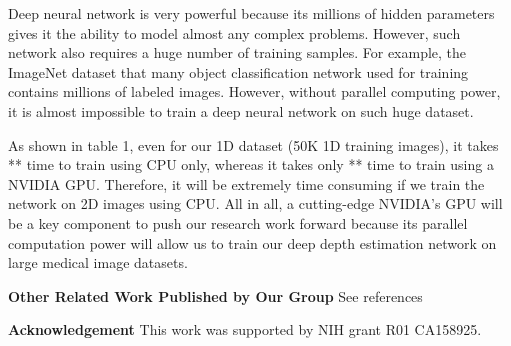 \documentclass{llncs}
\begin{document}
Deep neural network is very powerful because its millions of hidden parameters gives it the ability to model almost any complex problems. However, such network also requires a huge number of training samples. For example, the ImageNet dataset that many object classification network used for training contains millions of labeled images. However, without parallel computing power, it is almost impossible to train a deep neural network on such huge dataset. 

As shown in table 1, even for our 1D dataset (50K 1D training images), it takes ** time to train using CPU only, whereas it takes only ** time to train using a NVIDIA GPU.  Therefore, it will be extremely time consuming if we train the network on 2D images using CPU. All in all, a cutting-edge NVIDIA’s GPU will be a key component to push our research work forward because its parallel computation power will allow us to train our deep depth estimation network on large medical image datasets.


 

\textbf{Other Related Work Published by Our Group}
See references \cite{zhao2014,zhao2015}

\textbf{Acknowledgement} This work was supported by NIH grant R01 CA158925.










\end{document}
